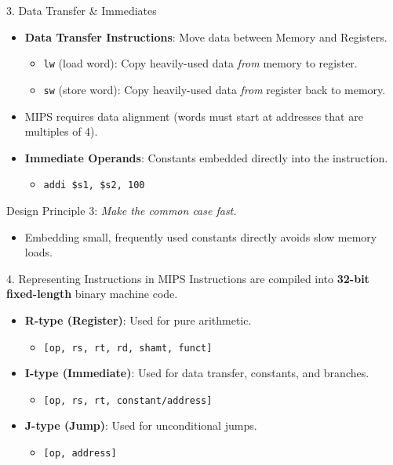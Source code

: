 \documentclass[aspectratio=169]{beamer}
\begin{document}
\begin{frame}{3. Data Transfer \& Immediates}
\begin{itemize}
    \item \textbf{Data Transfer Instructions}: Move data between Memory and Registers.
    \begin{itemize}
        \item \texttt{lw} (load word): Copy heavily-used data \textit{from} memory to register.
        \item \texttt{sw} (store word): Copy heavily-used data \textit{from} register back to memory.
    \end{itemize}
    \item MIPS requires data alignment (words must start at addresses that are multiples of 4).
    \item \textbf{Immediate Operands}: Constants embedded directly into the instruction.
    \begin{itemize}
        \item \texttt{addi \$s1, \$s2, 100}
    \end{itemize}
\end{itemize}
\begin{block}{Design Principle 3:}
\textit{Make the common case fast.}
\end{block}
\begin{itemize}
    \item Embedding small, frequently used constants directly avoids slow memory loads.
\end{itemize}
\end{frame}

\begin{frame}{4. Representing Instructions in MIPS}
Instructions are compiled into \textbf{32-bit fixed-length} binary machine code.
\vspace{0.3cm}
\begin{itemize}
    \item \textbf{R-type (Register)}: Used for pure arithmetic.
    \begin{itemize}
        \item \texttt{[op, rs, rt, rd, shamt, funct]}
    \end{itemize}
    \vspace{0.1cm}
    \item \textbf{I-type (Immediate)}: Used for data transfer, constants, and branches.
    \begin{itemize}
        \item \texttt{[op, rs, rt, constant/address]}
    \end{itemize}
    \vspace{0.1cm}
    \item \textbf{J-type (Jump)}: Used for unconditional jumps.
    \begin{itemize}
        \item \texttt{[op, address]}
    \end{itemize}
\end{itemize}
\end{frame}
\end{document}
